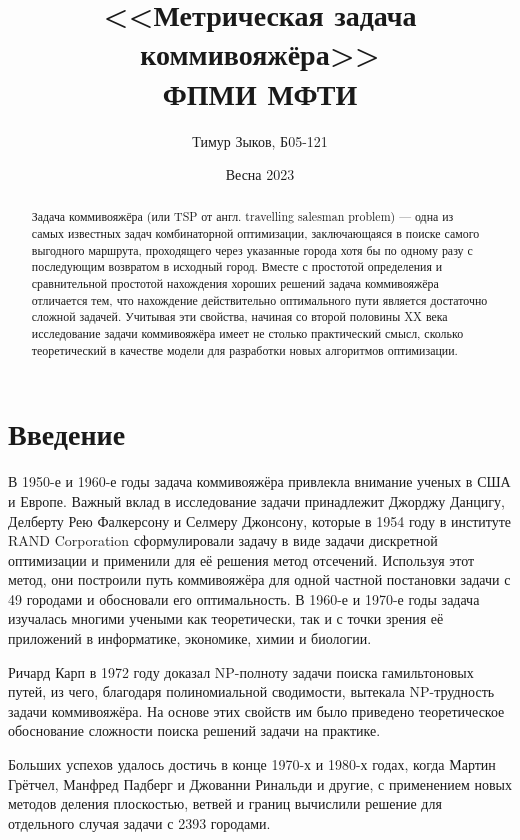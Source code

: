 \documentclass[a4paper,12pt]{article}
\date{Весна 2023}
\title{
    <<Метрическая задача коммивояжёра>>  \\ 
    \large ФПМИ МФТИ }
\author{
    {Тимур Зыков, Б05-121} %
}
\theoremstyle{plain}
\theoremstyle{definition}
\theoremstyle{remark}
\begin{document}
\maketitle

\newpage
\begin{abstract}
    Задача коммивояжёра (или TSP от англ. travelling salesman problem) — одна из самых известных задач комбинаторной оптимизации, заключающаяся в поиске самого выгодного маршрута, проходящего через указанные города хотя бы по одному разу с последующим возвратом в исходный город. Вместе с простотой определения и сравнительной простотой нахождения хороших решений задача коммивояжёра отличается тем, что нахождение действительно оптимального пути является достаточно сложной задачей. Учитывая эти свойства, начиная со второй половины XX века исследование задачи коммивояжёра имеет не столько практический смысл, сколько теоретический в качестве модели для разработки новых алгоритмов оптимизации.
\end{abstract}
  
\tableofcontents

\newpage

\section{Введение}
В 1950-е и 1960-е годы задача коммивояжёра привлекла внимание ученых в США и Европе. Важный вклад в исследование задачи принадлежит Джорджу Данцигу, Делберту Рею Фалкерсону и Селмеру Джонсону, которые в 1954 году в институте RAND Corporation сформулировали задачу в виде задачи дискретной оптимизации и применили для её решения метод отсечений. Используя этот метод, они построили путь коммивояжёра для одной частной постановки задачи с 49 городами и обосновали его оптимальность. В 1960-е и 1970-е годы задача изучалась многими учеными как теоретически, так и с точки зрения её приложений в информатике, экономике, химии и биологии.

Ричард Карп в 1972 году доказал NP-полноту задачи поиска гамильтоновых путей, из чего, благодаря полиномиальной сводимости, вытекала NP-трудность задачи коммивояжёра. На основе этих свойств им было приведено теоретическое обоснование сложности поиска решений задачи на практике.

Больших успехов удалось достичь в конце 1970-х и 1980-х годах, когда Мартин Грётчел, Манфред Падберг и Джованни Ринальди и другие, с применением новых методов деления плоскостью, ветвей и границ вычислили решение для отдельного случая задачи с 2393 городами.
\end{document}
